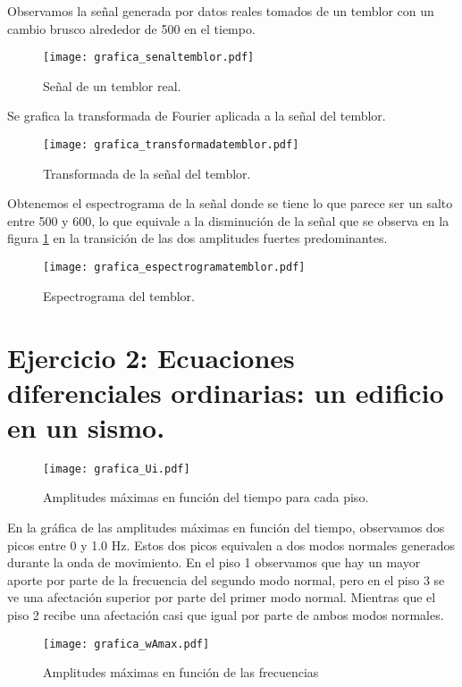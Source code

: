\documentclass[11pt,letterpaper]{exam}
\begin{document}
Observamos la señal generada por datos reales tomados de un temblor con un cambio brusco alrededor de 500 en el tiempo. \\
\begin{figure}[H]
\centering
\texttt{[image: grafica\_senaltemblor.pdf]}
\caption{Señal de un temblor real.}
\label{fig4}
\end{figure}

Se grafica la transformada de Fourier aplicada a la señal del temblor.\\
\begin{figure}[H]
\centering
\texttt{[image: grafica\_transformadatemblor.pdf]}
\caption{Transformada de la señal del temblor.}
\label{fig5}
\end{figure}

Obtenemos el espectrograma de la señal donde se tiene lo que parece ser un salto entre 500 y 600, lo que equivale a la disminución de la señal que se observa en la figura \ref{fig4} en la transición de las dos amplitudes fuertes predominantes. \\
\begin{figure}[H]
\centering
\texttt{[image: grafica\_espectrogramatemblor.pdf]}
\caption{Espectrograma del temblor.}
\label{fig6}
\end{figure}

\noindent
\section{Ejercicio 2: Ecuaciones diferenciales ordinarias: un edificio en un sismo.}


\begin{figure}[H]
\centering
\texttt{[image: grafica\_Ui.pdf]}
\caption{Amplitudes máximas en función del tiempo para cada piso.}
\label{fig7}
\end{figure}

En la gráfica de las amplitudes máximas en función del tiempo, observamos dos picos entre 0 y 1.0 Hz. Estos dos picos equivalen a dos modos normales generados durante la onda de movimiento. En el piso 1 observamos que hay un mayor aporte por parte de la frecuencia del segundo modo normal, pero en el piso 3 se ve una afectación superior por parte del primer modo normal. Mientras que el piso 2 recibe una afectación casi que igual por parte de ambos modos normales. \\
\begin{figure}[H]
\centering
\texttt{[image: grafica\_wAmax.pdf]}
\caption{Amplitudes máximas en función de las frecuencias}
\label{fig8}
\end{figure}
\end{document}
